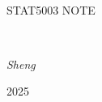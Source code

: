 \begin{titlepage}
	\centering
	\vspace*{3cm}
	\hrulefill\\
	\vspace{0.5cm}
	{\scshape\LARGE STAT5003 NOTE\par}
	\vspace{0.5cm}
	\hrulefill\\
	\vspace{1.5cm}

	{\normalsize\itshape Sheng\par}
	
	
	\vspace{14.5cm}
	{\normalsize 2025 \par}

\end{titlepage}